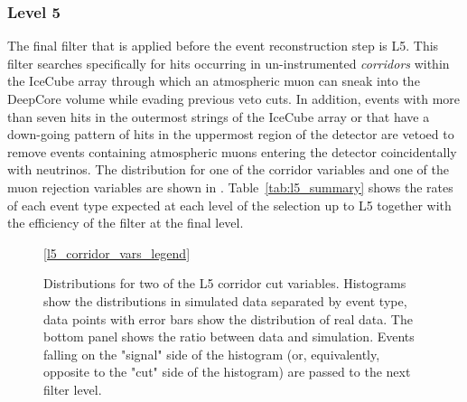 \subsubsection{Level 5}
The final filter that is applied before the event reconstruction step is L5.
This filter searches specifically for hits occurring in un-instrumented \emph{corridors} within the IceCube array through which an atmospheric muon can sneak into the DeepCore volume while evading previous veto cuts.
In addition, events with more than seven hits in the outermost strings of the IceCube array or that have a down-going pattern of hits in the uppermost region of the detector are vetoed to remove events containing atmospheric muons entering the detector coincidentally with neutrinos.
The distribution for one of the corridor variables and one of the muon rejection variables are shown in .
Table~\ref{tab:l5_summary} shows the rates of each event type expected at each level of the selection up to L5 together with the efficiency of the filter at the final level.
\begin{figure}
    \centering
    \ref{l5_corridor_vars_legend}
    
    
    \caption{Distributions for two of the L5 corridor cut variables. Histograms show the distributions in simulated data separated by event type, data points with error bars show the distribution of real data. The bottom panel shows the ratio between data and simulation. Events falling on the "signal" side of the histogram (or, equivalently, opposite to the "cut" side of the histogram) are passed to the next filter level.}
    \label{fig:l5-vars}
\end{figure}

